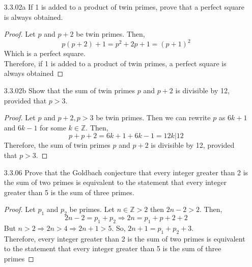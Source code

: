 \documentclass[12pt]{article}
\newcommand{\Z}{\mathds{Z}}
\begin{document}
\begin{enumerate}
	\item[3.3.02a] If 1 is added to a product of twin primes, prove that a perfect square is always obtained.
		\begin{proof}
			Let $ p $ and $ p+2 $ be twin primes. Then,
					\[p(p+2)+1=p^2+2p+1=(p+1)^2\]
			Which is a perfect square.\\
			Therefore, if 1 is added to a product of twin primes, a perfect square is always obtained
		\end{proof}
	\item[3.3.02b] Show that the sum of twin primes $ p $ and $ p+2 $ is divisible by 12, provided that $ p>3 $.
	\begin{proof}
		Let $ p $ and $ p+2, p>3 $ be twin primes. Then we can rewrite $ p $ as $ 6k+1 $ and $ 6k-1 $ for some $ k\in\Z $. Then, 
		\[p+p+2=6k+1+6k-1=12k|12\]
		Therefore, the sum of twin primes $ p $ and $ p+2 $ is divisible by 12, provided that $ p>3 $. 
	\end{proof}
		
	\item[3.3.06] Prove that the Goldbach conjecture that every integer greater than 2 is the sum of two primes is equivalent to the statement that every integer greater than 5 is the sum of three primes.
	\begin{proof}
		Let $ p_1 $ and $ p_2 $ be primes. Let $ n\in \Z >2 $ then $ 2n-2>2 $. Then,
		\[2n-2=p_1+p_2\Rightarrow 2n=p_1+p+2+2\]
		But $ n>2\Rightarrow 2n>4 \Rightarrow 2n+1>5 $. So, $ 2n+1=p_1+p_2+3 $.\\
		Therefore, every integer greater than 2 is the sum of two primes is equivalent to the statement that every integer greater than 5 is the sum of three primes
	\end{proof}
	

\end{enumerate}
\end{document}
